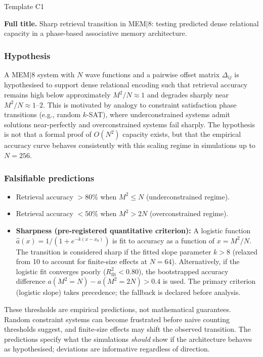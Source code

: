 \documentclass[11pt, a4paper]{article}
\newcommand{\mem}{MEM$|$8}
\begin{document}
\begin{predbox}{Template C1}

\textbf{Full title.}
Sharp retrieval transition in \mem{}: testing predicted dense relational
capacity in a phase-based associative memory architecture.

\subsubsection{Hypothesis}

A \mem{} system with $N$ wave functions and a pairwise offset matrix
$\Delta_{ij}$ is hypothesised to support dense relational encoding such that
retrieval accuracy remains high below approximately $M^2/N \approx 1$ and
degrades sharply near $M^2/N \approx 1$--$2$.  This is motivated by analogy
to constraint satisfaction phase transitions (e.g., random $k$-SAT), where
underconstrained systems admit solutions near-perfectly and overconstrained
systems fail sharply.  The hypothesis is not that a formal proof of $O(N^2)$
capacity exists, but that the empirical accuracy curve behaves consistently
with this scaling regime in simulations up to $N = 256$.

\subsubsection{Falsifiable predictions}

\begin{itemize}
  \item Retrieval accuracy $> 80\%$ when $M^2 \leq N$ (underconstrained regime).
  \item Retrieval accuracy $< 50\%$ when $M^2 > 2N$ (overconstrained regime).
  \item \textbf{Sharpness (pre-registered quantitative criterion):}  A logistic
    function $\hat{a}(x) = 1/(1 + e^{-k(x - x_0)})$ is fit to accuracy as a
    function of $x = M^2/N$.  The transition is considered sharp if the fitted
    slope parameter $k > 8$ (relaxed from 10 to account for finite-size effects
    at $N = 64$).  Alternatively, if the logistic fit converges poorly
    ($R^2_\text{fit} < 0.80$), the bootstrapped accuracy difference
    $a(M^2 = N) - a(M^2 = 2N) > 0.4$ is used.  The primary criterion
    (logistic slope) takes precedence; the fallback is declared before analysis.
\end{itemize}

These thresholds are empirical predictions, not mathematical guarantees.
Random constraint systems can become frustrated before naive counting thresholds
suggest, and finite-size effects may shift the observed transition.  The
predictions specify what the simulations \emph{should} show if the architecture
behaves as hypothesised; deviations are informative regardless of direction.


\end{predbox}
\end{document}
